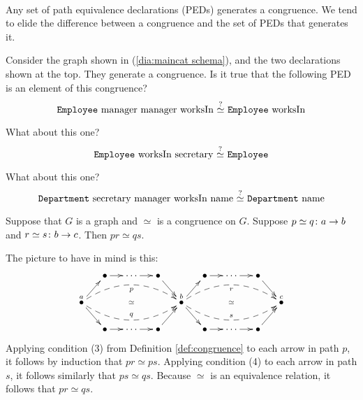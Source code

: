 \documentclass[CT4S-EN-RU]{subfiles}
\begin{document}
\begin{definitionRUS}\label{def:congruence}\
\end{definitionRUS}

\begin{blockENG}
Any set of path equivalence declarations (PEDs) generates a congruence. We tend to elide the difference between a congruence and the set of PEDs that generates it.
\end{blockENG}

\begin{blockRUS}
\end{blockRUS}

\begin{exerciseENG}\label{exc:generating congruence}
Consider the graph shown in (\ref{dia:maincat schema}), and the two declarations shown at the top. They generate a congruence. 
\sexc Is it true that the following PED is an element of this congruence? $$\textnormal{{\tt Employee} manager manager worksIn $\stackrel{?}{\simeq}$ {\tt Employee} worksIn}$$ \item What about this one? $$\textnormal{{\tt Employee} worksIn secretary $\stackrel{?}{\simeq}$ {\tt Employee}}$$ 
\item What about this one? $$\textnormal{{\tt Department} secretary manager worksIn name $\stackrel{?}{\simeq}$ {\tt Department} name}$$
\endsexc
\end{exerciseENG}

\begin{exerciseRUS}\label{exc:generating congruence}
\end{exerciseRUS}

\begin{lemmaENG}\label{lemma:composing PEDs}
Suppose that $G$ is a graph and $\simeq$ is a congruence on $G$. Suppose $p\simeq q\colon a\rightarrow b$ and $r\simeq s\colon b\rightarrow c$. Then $pr\simeq qs$.
\end{lemmaENG}

\begin{lemmaRUS}\label{lemma:composing PEDs}
\end{lemmaRUS}

\begin{proofENG}
The picture to have in mind is this: $$\xymatrix@=13pt{&\bullet\ar[r]&\cdots\ar[r]&\bullet\ar[dr]&&\bullet\ar[r]&\cdots\ar[r]&\bullet\ar[dr]\\\LMO{a}\ar@{}[rrrr]|{\simeq}\ar[ur]\ar[dr]\ar@{-->}@/^1.5pc/[rrrr]_p\ar@{-->}@/_1.5pc/[rrrr]^q&&&&\LMO{b}\ar@{}[rrrr]|{\simeq}\ar[ur]\ar[dr]\ar@{-->}@/^1.5pc/[rrrr]_r\ar@{-->}@/_1.5pc/[rrrr]^s&&&&\LMO{c}\\&\bullet\ar[r]&\cdots\ar[r]&\bullet\ar[ur]&&\bullet\ar[r]&\cdots\ar[r]&\bullet\ar[ur]}$$ Applying condition (3) from Definition \ref{def:congruence} to each arrow in path $p$, it follows by induction that $pr\simeq ps$. Applying condition (4) to each arrow in path $s$, it follows similarly that $ps\simeq qs$. Because $\simeq$ is an equivalence relation, it follows that $pr\simeq qs$. 
\end{proofENG}
\end{document}
